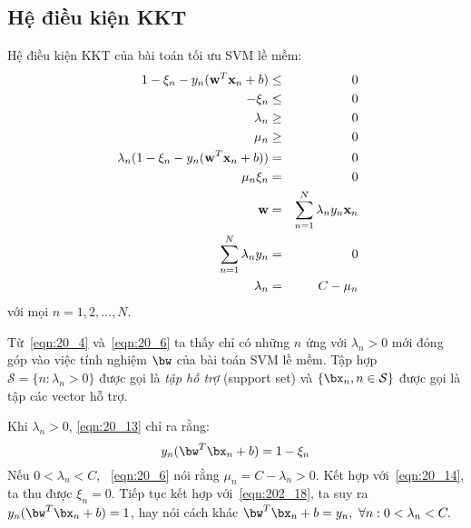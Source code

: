  
\subsection{Hệ điều kiện KKT}

Hệ điều kiện KKT của bài toán tối ưu SVM lề mềm:
\begin{eqnarray}  
    \label{eqn:20_9}
    1 - \xi_n - y_n(\mathbf{w}^T\mathbf{x}_n + b) &\leq& 0  \\\ 
    \label{eqn:20_10}
    -\xi_n &\leq& 0 \\\ 
    \label{eqn:20_11}
    \lambda_n &\geq& 0 \\\ 
    \label{eqn:20_12}
    \mu_n &\geq & 0 \\\ 
    \label{eqn:20_13}
    \lambda_n ( 1 - \xi_n - y_n(\mathbf{w}^T\mathbf{x}_n + b)) &=& 0 \\\ 
    \label{eqn:20_14}
    \mu_n \xi_n &=& 0 \\\ 
    \setcounter{equation}{6}
    \label{eqn:20_4}
    \mathbf{w} &=& \sum_{n=1}^N \lambda_n y_n \mathbf{x}_n \\\ 
    \sum_{n=1}^N \lambda_n y_n &=& 0 \\\ 
    \label{eqn:20_6}
\lambda_n &=& C - \mu_n 
\end{eqnarray} 
với
mọi $n = 1, 2, \dots, N$.

Từ~\eqref{eqn:20_4} và~\eqref{eqn:20_6} ta thấy chỉ có những $n$ ứng với $\lambda_n > 0$ mới đóng
góp
vào việc tính nghiệm $\bw$ của bài toán SVM lề mềm. Tập hợp $\mathcal{S} = \{n: \lambda_n > 0\}$
được gọi là \textit{tập hỗ trợ} (support set) và $\{\bx_n, n \in \mathcal{S}\}$ được gọi là
tập các vector hỗ trợ.
\setcounter{equation}{17}

\def\NM{N_{\mathcal{M}}}
Khi $\lambda_n > 0$, \eqref{eqn:20_13} chỉ ra rằng: 
\begin{equation}
    \label{eqn:202_18}
    y_n(\bw^T\bx_n + b) = 1 - \xi_n
\end{equation}
Nếu $0<\lambda_n < C$, ~\eqref{eqn:20_6} nói rằng $\mu_n = C
- \lambda_n > 0$. Kết hợp với~\eqref{eqn:20_14}, ta thu được $\xi_n = 0$. Tiếp
tục kết hợp với~\eqref{eqn:202_18}, ta suy ra $y_n(\bw^T\bx_n + b) = 1$, hay nói
cách khác
\begin{math}
    \bw^T\bx_n + b = y_n, ~\forall n: 0 < \lambda_n < C. 
\end{math}

